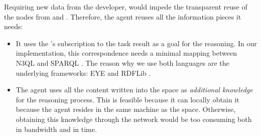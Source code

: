 Requiring new data from the developer, would impede the transparent reuse of the nodes from \implSpace{} and \implRest{}.
Therefore, the agent reuses all the information pieces it needs:
\begin{itemize}
  \item It uses the \nodeConsSpace{}'s subscription to the task result as a goal for the reasoning.
	In our implementation, this correspondence needs a minimal mapping between N3QL  and SPARQL .
	The reason why we use both languages are the underlying frameworks: EYE  and RDFLib .
	
  \item The agent uses all the content written into the space as \emph{additional knowledge} for the reasoning process.
	This is feasible because it can locally obtain it because the agent resides in the same machine as the space.
	Otherwise, obtaining this knowledge through the network would be too consuming both in bandwidth and in time.
\end{itemize}


